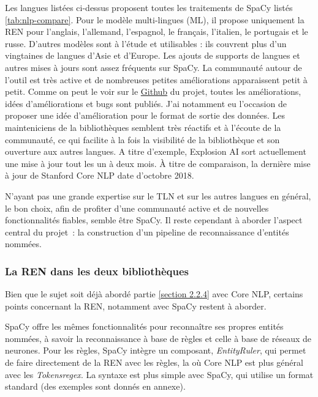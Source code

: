 Les langues listées ci-dessus proposent toutes les traitements de SpaCy listés \autoref{tab:nlp-compare}. Pour le modèle multi-lingues (ML), il propose uniquement la REN pour l'anglais, l'allemand, l'espagnol, le français, l'italien, le portugais et le russe. D'autres modèles sont à l'étude et utilisables : ils couvrent plus d'un vingtaines de langues d'Asie et d'Europe. Les ajouts de supports de langues et autres mises à jours sont assez fréquents sur SpaCy. La communauté autour de l'outil est très active et de nombreuses petites améliorations apparaissent petit à petit. Comme on peut le voir sur le \href{https://github.com/explosion/spaCy}{Github} \cite{spacy-repo} du projet, toutes les améliorations, idées d'améliorations et bugs sont publiés. J'ai notamment eu l'occasion de proposer une idée d'amélioration pour le format de sortie des données. Les mainteniciens de la bibliothèques semblent très réactifs et à l'écoute de la communauté, ce qui facilite à la fois la visibilité de la bibliothèque et son ouverture aux autres langues. A titre d'exemple, Explosion AI sort actuellement une mise à jour tout les un à deux mois. À titre de comparaison, la dernière mise à jour de Stanford Core NLP date d'octobre 2018.
\newline

N'ayant pas une grande expertise sur le TLN et sur les autres langues en général, le bon choix, afin de profiter d'une communauté active et de nouvelles fonctionnalités fiables, semble être SpaCy. Il reste cependant à aborder l'aspect central du projet~: la construction d'un pipeline de reconnaissance d'entités nommées.
\label{section 3.1.3}

\subsubsection{La REN dans les deux bibliothèques}
Bien que le sujet soit déjà abordé partie \ref{section 2.2.4} avec Core NLP, certains points concernant la REN, notamment avec SpaCy restent à aborder. 
\newline

SpaCy offre les mêmes fonctionnalités pour reconnaître ses propres entités nommées, à savoir la reconnaissance à base de règles et celle à base de réseaux de neurones. Pour les règles, SpaCy intègre un composant, \textit{EntityRuler}, qui permet de faire directement de la REN avec les règles, la où Core NLP est plus général avec les \textit{Tokensregex}. La syntaxe est plus simple avec SpaCy, qui utilise un format standard (des exemples sont donnés en annexe).
\newline

